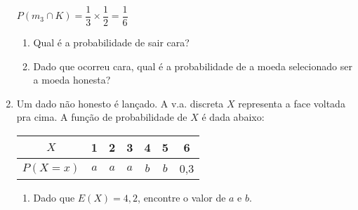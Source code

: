 \begin{enumerate}
{    		$P(m_{3}\cap K) = \dfrac{1}{3}\times \dfrac{1}{2} = \dfrac{1}{6}$
    		
	}

	\begin{enumerate}[label=\alph*.]
    		\item Qual é a probabilidade de sair cara?
    		
		
		\item Dado que ocorreu cara, qual é a probabilidade de a moeda selecionado ser a moeda honesta?
		
		
	\end{enumerate}

\item Um dado não honesto é lançado. A v.a. discreta $X$ representa a face voltada pra cima. A função de probabilidade de $X$ é dada abaixo:

    \begin{center}
        \begin{tabular}{|c|c|c|c|c|c|c|}
            \hline
            $X$          & 1 & 2  & 3 & 4 & 5 & 6 \\ \hline
            $P(X=x)$ & $a$ & $a$ & $a$ & $b$ & $b$ & 0,3 \\ \hline
        \end{tabular}
    \end{center}

	\solv{
		\[\sum\limits_{i=1}^np(x_{i}) = 1;\ E(X) = \sum^{n}_{i=1} x_{i}p(x_{i});\ E(X^{2}) = \sum^{n}_{i=1} x_{i}^{2}p(x_{i});\ Var(X) = E(X^{2}) - [E(X)]^{2}\]
	}
	\begin{enumerate}[label=\alph*.]
		\item Dado que $E(X) = 4,2$, encontre o valor de $a$ e $b$.
		

\end{enumerate}
\end{enumerate}
